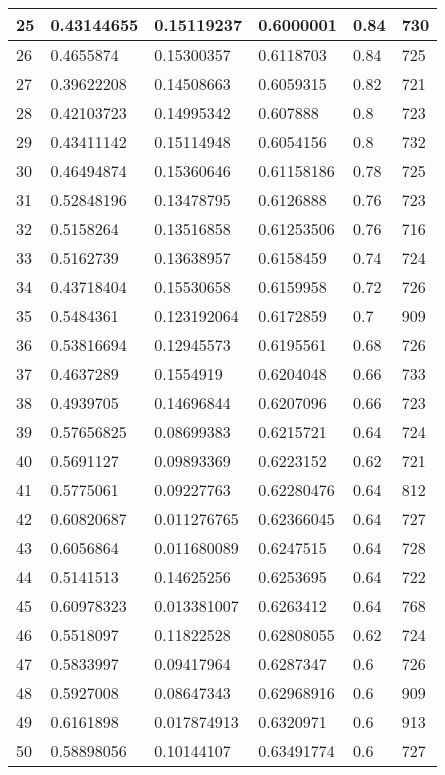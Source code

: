 \begin{longtable}{|l|l|l|l|l|l|}
25 & 0.43144655 & 0.15119237 & 0.6000001 & 0.84 & 730 \\ \hline 
26 & 0.4655874 & 0.15300357 & 0.6118703 & 0.84 & 725 \\ \hline 
27 & 0.39622208 & 0.14508663 & 0.6059315 & 0.82 & 721 \\ \hline 
28 & 0.42103723 & 0.14995342 & 0.607888 & 0.8 & 723 \\ \hline 
29 & 0.43411142 & 0.15114948 & 0.6054156 & 0.8 & 732 \\ \hline 
30 & 0.46494874 & 0.15360646 & 0.61158186 & 0.78 & 725 \\ \hline 
31 & 0.52848196 & 0.13478795 & 0.6126888 & 0.76 & 723 \\ \hline 
32 & 0.5158264 & 0.13516858 & 0.61253506 & 0.76 & 716 \\ \hline 
33 & 0.5162739 & 0.13638957 & 0.6158459 & 0.74 & 724 \\ \hline 
34 & 0.43718404 & 0.15530658 & 0.6159958 & 0.72 & 726 \\ \hline 
35 & 0.5484361 & 0.123192064 & 0.6172859 & 0.7 & 909 \\ \hline 
36 & 0.53816694 & 0.12945573 & 0.6195561 & 0.68 & 726 \\ \hline 
37 & 0.4637289 & 0.1554919 & 0.6204048 & 0.66 & 733 \\ \hline 
38 & 0.4939705 & 0.14696844 & 0.6207096 & 0.66 & 723 \\ \hline 
39 & 0.57656825 & 0.08699383 & 0.6215721 & 0.64 & 724 \\ \hline 
40 & 0.5691127 & 0.09893369 & 0.6223152 & 0.62 & 721 \\ \hline 
41 & 0.5775061 & 0.09227763 & 0.62280476 & 0.64 & 812 \\ \hline 
42 & 0.60820687 & 0.011276765 & 0.62366045 & 0.64 & 727 \\ \hline 
43 & 0.6056864 & 0.011680089 & 0.6247515 & 0.64 & 728 \\ \hline 
44 & 0.5141513 & 0.14625256 & 0.6253695 & 0.64 & 722 \\ \hline 
45 & 0.60978323 & 0.013381007 & 0.6263412 & 0.64 & 768 \\ \hline 
46 & 0.5518097 & 0.11822528 & 0.62808055 & 0.62 & 724 \\ \hline 
47 & 0.5833997 & 0.09417964 & 0.6287347 & 0.6 & 726 \\ \hline 
48 & 0.5927008 & 0.08647343 & 0.62968916 & 0.6 & 909 \\ \hline 
49 & 0.6161898 & 0.017874913 & 0.6320971 & 0.6 & 913 \\ \hline 
50 & 0.58898056 & 0.10144107 & 0.63491774 & 0.6 & 727 \\ \hline 
\end{longtable}